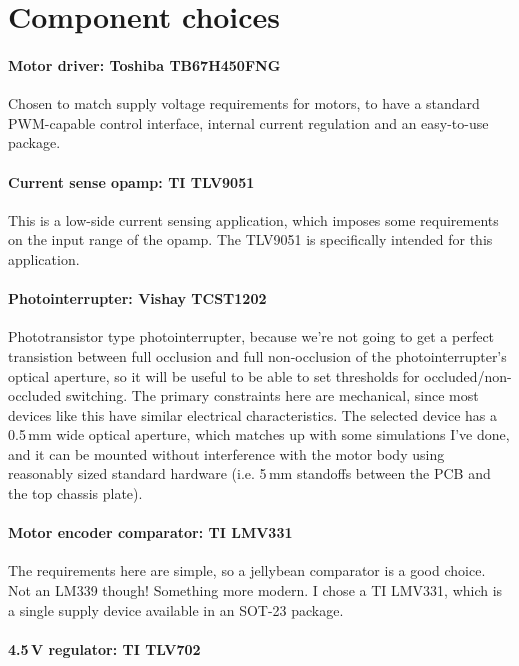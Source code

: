 \documentclass[a4paper,11pt,article]{memoir}
\begin{document}
\section{Component choices}

\paragraph{Motor driver: Toshiba TB67H450FNG}

Chosen to match supply voltage requirements for motors, to have a
standard PWM-capable control interface, internal current regulation
and an easy-to-use package.

\paragraph{Current sense opamp: TI TLV9051}

This is a low-side current sensing application, which imposes some
requirements on the input range of the opamp. The TLV9051 is
specifically intended for this application.

\paragraph{Photointerrupter: Vishay TCST1202}

Phototransistor type photointerrupter, because we're not going to get
a perfect transistion between full occlusion and full non-occlusion of
the photointerrupter's optical aperture, so it will be useful to be
able to set thresholds for occluded/non-occluded switching. The
primary constraints here are mechanical, since most devices like this
have similar electrical characteristics. The selected device has a
0.5\,mm wide optical aperture, which matches up with some simulations
I've done, and it can be mounted without interference with the motor
body using reasonably sized standard hardware (i.e. 5\,mm standoffs
between the PCB and the top chassis plate).

\paragraph{Motor encoder comparator: TI LMV331}

The requirements here are simple, so a jellybean comparator is a good
choice. Not an LM339 though! Something more modern. I chose a TI
LMV331, which is a single supply device available in an SOT-23 package.

\paragraph{4.5\,V regulator: TI TLV702}
\end{document}
